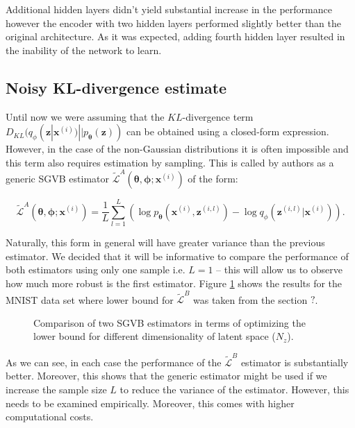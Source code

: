 \documentclass[../report.tex]{subfiles}
\begin{document}
Additional hidden layers didn't yield substantial increase in the performance however the encoder with two hidden layers performed slightly better than the original architecture. As it was expected, adding fourth hidden layer resulted in the inability of the network to learn.

\subsection{Noisy KL-divergence estimate}
Until now we were assuming that the $KL$-divergence term $D_{KL} (q_{\phi}(\mathbf{z} | \mathbf{x}^{(i)}) || p_{\boldsymbol{\theta}}( \mathbf{z}) ) $ can be obtained using a closed-form expression. However, in the case of the non-Gaussian distributions it is often impossible and this term also requires estimation by sampling. This is called by authors as a generic SGVB estimator $\widetilde{\mathcal{L}}^{A}(\boldsymbol{\theta}, \boldsymbol{\phi}; \mathbf{x}^{(i)})$ of the form:

$$ \widetilde{\mathcal{L}}^{A}(\boldsymbol{\theta}, \boldsymbol{\phi}; \mathbf{x}^{(i)}) = \frac{1}{L} \sum_{l=1}^L \left( \log p_{\boldsymbol{\theta}}(\mathbf{x}^{(i)}, \mathbf{z}^{(i,l)}) - \log q_{\phi}(\mathbf{z}^{(i,l)} | \mathbf{x}^{(i)}) \right).$$

Naturally, this form in general will have greater variance than the previous estimator. We decided that it will be informative to compare the performance of both estimators using only one sample i.e. $L=1$ -- this will allow us to observe how much more robust is the first estimator. Figure \ref{fig:mnist_LAvsLB} shows the results for the MNIST data set where lower bound for $\widetilde{\mathcal{L}}^{B}$ was taken from the section $?$.

\begin{figure}[!htb]
\centering

  \caption[1]{Comparison of two SGVB estimators in terms of optimizing the lower bound for different dimensionality of latent space ($N_z$). }
  \label{fig:mnist_LAvsLB}
\end{figure}

As we can see, in each case the performance of the $\widetilde{\mathcal{L}}^{B}$ estimator is substantially better. Moreover, this shows that the generic estimator might be used if we increase the sample size $L$ to reduce the variance of the estimator. However, this needs to be examined empirically. Moreover, this comes with higher computational costs.
\end{document}
